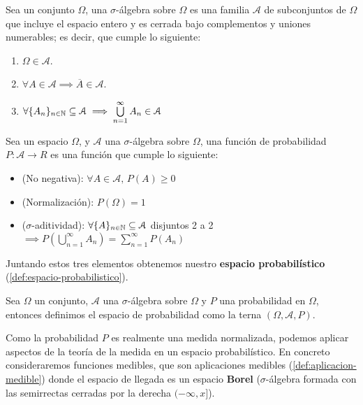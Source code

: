 \begin{definicion}
  Sea un conjunto $\Omega$, una $\sigma$-álgebra sobre $\Omega$ es una familia $\mathcal{A}$ de subconjuntos de $\Omega$ que incluye el espacio entero y es cerrada bajo complementos y uniones numerables; es decir, que cumple lo siguiente:
  \begin{enumerate}
    \item $\Omega \in \mathcal{A}$.
    \item $\forall A \in \mathcal{A} \implies \overline{A} \in \mathcal{A}$.
    \item $\forall \{A_n\}_{n \in \mathbb{N}} \subseteq \mathcal{A} \implies \bigcup \limits^\infty_{n = 1} A_n \in \mathcal{A}$
  \end{enumerate}
  \label{def:sigma-algebra}
\end{definicion}

\begin{definicion}
  Sea un espacio $\Omega$, y $\mathcal{A}$ una $\sigma$-álgebra sobre $\Omega$, una función de probabilidad $P : \mathcal{A} \to R$ es una función que cumple lo siguiente:

  \begin{itemize}
    \item (No negativa): $\forall A \in \mathcal{A}, \, P(A) \geq 0$
    \item (Normalización): $P(\Omega) = 1$
    \item ($\sigma$-aditividad): $\forall \{A\}_{n \in \mathbb{N}} \subseteq \mathcal{A}$ disjuntos 2 a 2 $\implies P \left(\bigcup \limits^\infty_{n = 1} A_n \right) = \sum \limits^\infty_{n = 1} P(A_n)$
  \end{itemize}
  \label{def:probabilidad}
\end{definicion}

Juntando estos tres elementos obtenemos nuestro \textbf{espacio probabilístico} (\autoref{def:espacio-probabilistico}).

\begin{definicion}
  Sea $\Omega$ un conjunto, $\mathcal{A}$ una $\sigma$-álgebra sobre $\Omega$ y $P$ una probabilidad en $\Omega$, entonces definimos el espacio de probabilidad como la terna $(\Omega, \mathcal{A}, P)$.
  \label{def:espacio-probabilistico}
\end{definicion}

Como la probabilidad $P$ es realmente una medida normalizada, podemos aplicar aspectos de la teoría de la medida en un espacio probabilístico. En concreto consideraremos funciones medibles, que son aplicaciones medibles (\autoref{def:aplicacion-medible}) donde el espacio de llegada es un espacio \textbf{Borel} ($\sigma$-álgebra formada con las semirrectas cerradas por la derecha $(-\infty, x]$).

